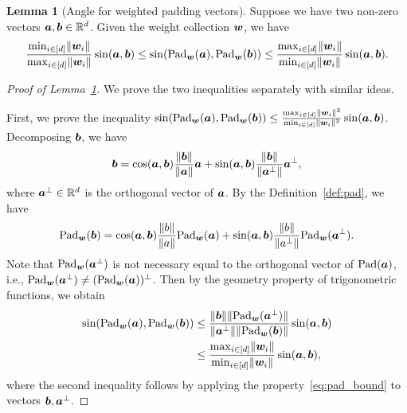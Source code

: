 \documentclass[lettersize,onecolumn,journal]{IEEEtran}
\theoremstyle{definition}
\newtheorem{lem}{Lemma}
\theoremstyle{definition}
\begin{document}
\begin{lem}[Angle for weighted padding vectors]\label{lem:pad} Suppose we have two non-zero vectors $\bm{a}, \bm{b} \in \mathbb{R}^d$. Given the weight collection $\bm{w}$, we have 
\begin{equation}
   \frac{\min_{i \in [d]} \lVert\bm{w}_i\rVert}{\max_{i \in [d]} \lVert\bm{w}_i\rVert } \sin (\bm{a}, \bm{b}) \leq \sin(\text{Pad}_{\bm{w}}(\bm{a}),  \text{Pad}_{\bm{w}}(\bm{b})) \leq \frac{ \max_{i \in [d]} \lVert\bm{w}_i\rVert }{\min_{i \in [d]} \lVert\bm{w}_i\rVert} \sin (\bm{a}, \bm{b}).
\end{equation}
\end{lem}

\begin{proof}[Proof of Lemma~\ref{lem:pad}] We prove the two inequalities separately with similar ideas.

First, we prove the inequality $\sin(\text{Pad}_{\bm{w}}(\bm{a}),  \text{Pad}_{\bm{w}}(\bm{b})) \leq \frac{ \max_{i \in [d]} \lVert\bm{w}_i\rVert^2 }{\min_{i \in [d]} \lVert\bm{w}_i\rVert^2} \sin (\bm{a}, \bm{b})$. Decomposing $\bm{b}$, we have
\begin{equation}
    \bm{b} = \cos (\bm{a}, \bm{b}) \frac{\lVert\bm{b}\rVert}{\lVert\bm{a}\rVert} \bm{a} + \sin (\bm{a}, \bm{b}) \frac{\lVert\bm{b}\rVert}{\lVert\bm{a}^{\perp}\rVert}\bm{a}^{\perp},
\end{equation}
where $\bm{a}^{\perp} \in \mathbb{R}^d$ is the orthogonal vector of $\bm{a}$. By the Definition~\ref{def:pad}, we have 
\begin{equation}\label{eq:pad_second_ineq}
    \pad_{\mw}(\mb) = \cos (\ma, \mb) \frac{\onormSize{}{b}}{\onormSize{}{a}} \pad_{\mw}(\ma) + \sin (\ma, \mb) \frac{\onormSize{}{b}}{\onormSize{}{a^{\perp}}} \pad_{\mw}(\ma^{\perp}).
\end{equation}
Note that $\text{Pad}_{\bm{w}}(\bm{a}^{\perp})$ is not necessary equal to the orthogonal vector of $\text{Pad}(\bm{a})$, i.e., $\text{Pad}_{\bm{w}}(\bm{a}^{\perp}) \neq (\text{Pad}_{\bm{w}}(\bm{a}))^{\perp}$. Then by the geometry property of trigonometric functions, we obtain
\begin{align}
    \sin(\text{Pad}_{\bm{w}}(\bm{a}),  \text{Pad}_{\bm{w}}(\bm{b}))  &\leq \frac{  \lVert\bm{b}\rVert \lVert\text{Pad}_{\bm{w}}(\bm{a}^{\perp})\rVert }{ \lVert\bm{a}^{\perp}\rVert \lVert \text{Pad}_{\bm{w}}(\bm{b})\rVert} \sin (\bm{a}, \bm{b})  \\
    & \leq  \frac{ \max_{i \in [d]} \lVert\bm{w}_i\rVert }{\min_{i \in [d]} \lVert\bm{w}_i\rVert} \sin (\bm{a}, \bm{b}),
\end{align}
where the second inequality follows by applying the property~\eqref{eq:pad_bound} to vectors $\bm{b}, \bm{a}^{\perp}$. 


\end{proof}
\end{document}
